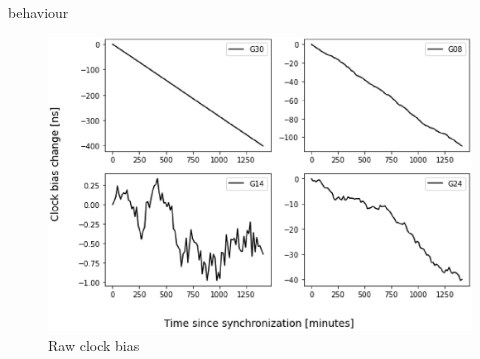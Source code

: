 \documentclass{article}
\begin{document}
behaviour
\begin{figure}[htb] 
\centering
\includegraphics[width=\textwidth]{figures/bias_raw}
\caption{Raw clock bias}
\label{fig:bias_raw}
\end{figure}

\end{document}
